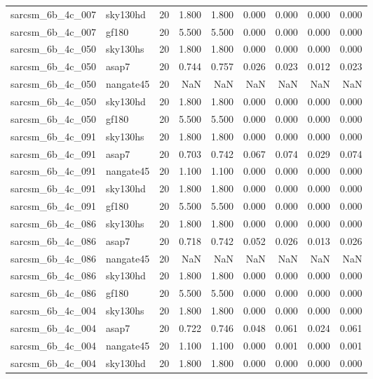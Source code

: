 \begin{tabular}{llrrrrrrr}
sarcsm\_6b\_4c\_007 & sky130hd & 20 & 1.800 & 1.800 & 0.000 & 0.000 & 0.000 & 0.000 \\
sarcsm\_6b\_4c\_007 & gf180 & 20 & 5.500 & 5.500 & 0.000 & 0.000 & 0.000 & 0.000 \\
sarcsm\_6b\_4c\_050 & sky130hs & 20 & 1.800 & 1.800 & 0.000 & 0.000 & 0.000 & 0.000 \\
sarcsm\_6b\_4c\_050 & asap7 & 20 & 0.744 & 0.757 & 0.026 & 0.023 & 0.012 & 0.023 \\
sarcsm\_6b\_4c\_050 & nangate45 & 20 & NaN & NaN & NaN & NaN & NaN & NaN \\
sarcsm\_6b\_4c\_050 & sky130hd & 20 & 1.800 & 1.800 & 0.000 & 0.000 & 0.000 & 0.000 \\
sarcsm\_6b\_4c\_050 & gf180 & 20 & 5.500 & 5.500 & 0.000 & 0.000 & 0.000 & 0.000 \\
sarcsm\_6b\_4c\_091 & sky130hs & 20 & 1.800 & 1.800 & 0.000 & 0.000 & 0.000 & 0.000 \\
sarcsm\_6b\_4c\_091 & asap7 & 20 & 0.703 & 0.742 & 0.067 & 0.074 & 0.029 & 0.074 \\
sarcsm\_6b\_4c\_091 & nangate45 & 20 & 1.100 & 1.100 & 0.000 & 0.000 & 0.000 & 0.000 \\
sarcsm\_6b\_4c\_091 & sky130hd & 20 & 1.800 & 1.800 & 0.000 & 0.000 & 0.000 & 0.000 \\
sarcsm\_6b\_4c\_091 & gf180 & 20 & 5.500 & 5.500 & 0.000 & 0.000 & 0.000 & 0.000 \\
sarcsm\_6b\_4c\_086 & sky130hs & 20 & 1.800 & 1.800 & 0.000 & 0.000 & 0.000 & 0.000 \\
sarcsm\_6b\_4c\_086 & asap7 & 20 & 0.718 & 0.742 & 0.052 & 0.026 & 0.013 & 0.026 \\
sarcsm\_6b\_4c\_086 & nangate45 & 20 & NaN & NaN & NaN & NaN & NaN & NaN \\
sarcsm\_6b\_4c\_086 & sky130hd & 20 & 1.800 & 1.800 & 0.000 & 0.000 & 0.000 & 0.000 \\
sarcsm\_6b\_4c\_086 & gf180 & 20 & 5.500 & 5.500 & 0.000 & 0.000 & 0.000 & 0.000 \\
sarcsm\_6b\_4c\_004 & sky130hs & 20 & 1.800 & 1.800 & 0.000 & 0.000 & 0.000 & 0.000 \\
sarcsm\_6b\_4c\_004 & asap7 & 20 & 0.722 & 0.746 & 0.048 & 0.061 & 0.024 & 0.061 \\
sarcsm\_6b\_4c\_004 & nangate45 & 20 & 1.100 & 1.100 & 0.000 & 0.001 & 0.000 & 0.001 \\
sarcsm\_6b\_4c\_004 & sky130hd & 20 & 1.800 & 1.800 & 0.000 & 0.000 & 0.000 & 0.000 \\

\end{tabular}
